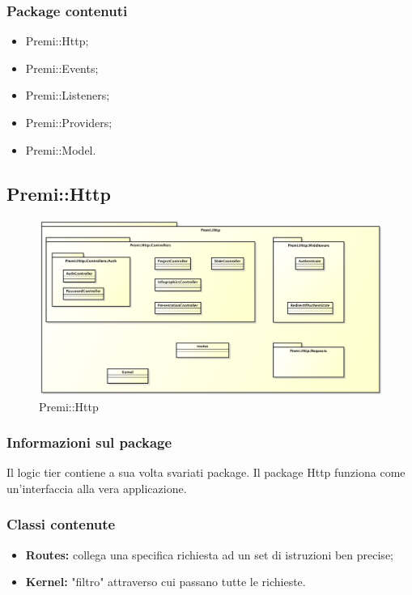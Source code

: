 	\subsubsection*{Package contenuti}
	\begin{itemize}
		\item Premi::Http;
		\item Premi::Events;
		\item Premi::Listeners;
		\item Premi::Providers;
		\item Premi::Model.
	\end{itemize}

\newpage
\subsection{Premi::Http}
		\begin{figure}[h]
			\centering
			\includegraphics[width=0.9\linewidth]{img/premi_http}
			\caption[Premi::Http]{Premi::Http}
			\label{fig:premi_http}
		\end{figure}

	\subsubsection*{Informazioni sul package}
	 Il logic tier contiene a sua volta svariati package. Il package Http funziona come un'interfaccia alla vera applicazione.
	 \subsubsection*{Classi contenute}
	 \begin{itemize}
	 	\item \textbf{Routes: }collega una specifica richiesta ad un set di istruzioni ben precise;
	 	\item \textbf{Kernel: }"filtro" attraverso cui passano tutte le richieste.
	 \end{itemize}
